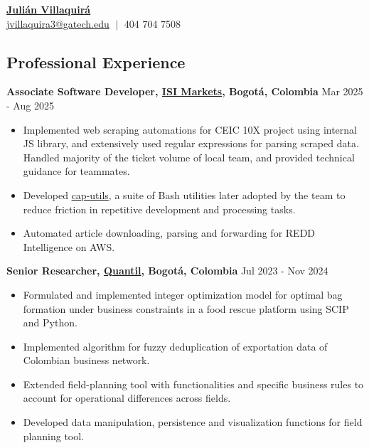 \documentclass{article}
\begin{document}
\vspace{-6em}
\begin{center}
  {\LARGE\textbf{\href{https://jcvillaquira.github.io/}{Juli\'an Villaquir\'a}}}\\[5pt]
{\large \href{mailto:jvillaquira3@gatech.edu}{\textcolor{myblue}{jvillaquira3@gatech.edu}} $\;\vert\;$ 404 704 7508}
\end{center}

\subsection*{Professional Experience}
\textbf{Associate Software Developer, \href{https://www.isimarkets.com/}{\textcolor{myblue}{ISI Markets}}, Bogot\'a, Colombia} \hfill {Mar 2025 - Aug 2025}
\vspace{-0.3em}
\begin{itemize}
\renewcommand\labelitemi{\small$\bullet$}
\item {\small Implemented web scraping automations for CEIC 10X project using internal JS library, and extensively used regular expressions for parsing scraped data. Handled majority of the ticket volume of local team, and provided technical guidance for teammates.} \vspace{-0.5em}
\item {\small Developed \href{https://github.com/jcvillaquira/cap-utils}{\textcolor{myblue}{cap-utils}}, a suite of Bash utilities later adopted by the team to reduce friction in repetitive development and processing tasks.} \vspace{-0.5em}
\item {\small Automated article downloading, parsing and forwarding for REDD Intelligence on AWS.}
\end{itemize}
\textbf{Senior Researcher, \href{https://quantil.co/en/}{\textcolor{myblue}{Quantil}}, Bogot\'a, Colombia} \hfill {Jul 2023 - Nov 2024}
\vspace{-0.3em}
\begin{itemize}
\renewcommand\labelitemi{\small$\bullet$}
\item {\small Formulated and implemented integer optimization model for optimal bag formation under business constraints in a food rescue platform using SCIP and Python.}\vspace{-0.5em}
\item {\small Implemented algorithm for fuzzy deduplication of exportation data of Colombian business network.}\vspace{-0.5em}
\item {\small Extended field-planning tool with functionalities and specific business rules to account for operational differences across fields.}\vspace{-0.5em}
\item {\small Developed data manipulation, persistence and visualization functions for field planning tool.}
\end{itemize}
\end{document}
